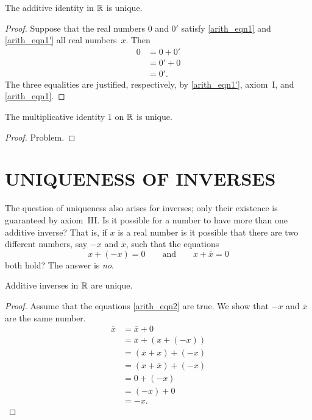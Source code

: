 \begin{prop} The additive identity in $\mathbb{R}$ is unique.
\end{prop}

\begin{proof}  Suppose that the real numbers $0$ and $0'$ satisfy
\eqref{arith_eqn1} and \eqref{arith_eqn1'} all real numbers~$x$.
Then
\begin{align*}    0 &= 0 + 0' \\
                    &= 0' + 0 \\
                    &= 0'.
\end{align*}
The three equalities are justified, respectively, by
\eqref{arith_eqn1'}, axiom~I, and \eqref{arith_eqn1}.
\end{proof}

\begin{prop} The multiplicative identity $1$ on $\mathbb{R}$ is unique.
\end{prop}

\begin{proof} Problem. \ns  \end{proof}




\section{UNIQUENESS OF INVERSES}  The question of uniqueness also arises for inverses; only
their existence is guaranteed by axiom~III.  Is it possible for a number to have more than one
additive inverse?  That is, if $x$ is a real number is it possible that there are two
different numbers, say $-x$ and $\overline x$, such that the equations
\begin{equation}\label{arith_eqn2} x + (-x) = 0 \qquad
            \text{and} \qquad x + \overline x = 0
\end{equation}
both hold?  The answer is \emph{no}.

\begin{prop}\label{addinv_uniq} Additive inverses in $\mathbb{R}$ are unique.
\end{prop}

\begin{proof} Assume that the equations \eqref{arith_eqn2} are true.  We show that $-x$ and
$\overline x$ are the same number.
  \begin{align*}
           \overline x &= \overline x + 0 \\
                       &= \overline x + (x + (-x)) \\
                       &= (\overline x + x) + (-x) \\
                       &= (x + \overline x) + (-x) \\
                       &= 0 + (-x) \\
                       &= (-x) + 0 \\
                       &= -x.
  \end{align*}
\end{proof}

